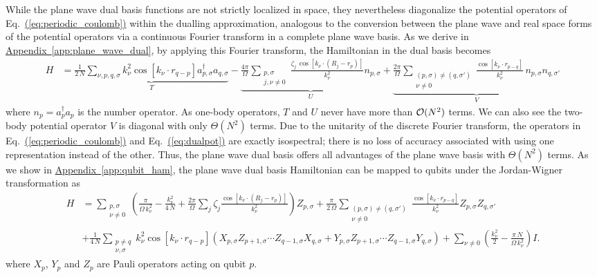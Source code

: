 \documentclass[superscriptaddress,aps,pra,nofootinbib,notitlepage,10pt,longbibliography]{revtex4-1}
\newcommand{\eq}[1]{Eq.~\hyperref[eq:#1]{(\ref*{eq:#1})}}
\DeclareRobustCommand{\app}[1]{\hyperref[app:#1]{Appendix~\ref*{app:#1}}}
\begin{document}
While the plane wave dual basis functions are not strictly localized in space, they nevertheless diagonalize the potential operators of \eq{periodic_coulomb} within the dualling approximation, analogous to the conversion between the plane wave
and real space forms of the potential operators
via a continuous Fourier transform in a complete plane wave basis. As we derive in \app{plane_wave_dual}, by applying this Fourier transform, the Hamiltonian in the dual basis becomes
\begin{align}
\label{eq:dualpot}
H & = \underbrace{\frac{1}{2\, N} \!\!\!\sum_{\nu, p, q, \sigma} \!\! k_\nu^2 \cos \left[k_\nu \cdot r_{q - p} \right] a^\dagger_{p, \sigma} a_{q,\sigma}}_{T}
%
- \underbrace{\frac{4 \pi}{\Omega} \sum_{\substack{p,\sigma \\ j, \nu\neq 0}} \frac{\zeta_j \, \cos\left[ k_{\nu} \cdot \left(R_j - r_{p}\right)\right]}{k_\nu^2} n_{p, \sigma}}_{U} +
%
\underbrace{\frac{2 \pi}{\Omega } \!\!\!\!\! \sum_{\substack{(p, \sigma) \neq (q, \sigma') \\ \nu \neq 0}}\!\!\!\!\!\!\!\! \frac{\cos \left[k_\nu \cdot r_{p-q}\right]}{k_\nu^2} \, n_{p, \sigma} n_{q, \sigma'}}_{V}
\end{align}
where $n_{p} = a^\dagger_{p} a_{p}$ is the number operator. As one-body operators, $T$ and $U$ never have more than ${\cal O}(N^2)$ terms. We can also see the two-body potential operator $V$ is diagonal with only $\Theta(N^2)$ terms. Due to the unitarity of the discrete Fourier transform, the operators in \eq{periodic_coulomb} and \eq{dualpot} are exactly isospectral; there is no loss of accuracy associated with using one representation instead of the other. Thus, the plane wave dual basis offers all advantages of the plane wave basis with $\Theta(N^2)$ terms. As we show in \app{qubit_ham}, the plane wave dual basis Hamiltonian can be mapped to qubits under the Jordan-Wigner transformation as
\begin{align}
\label{eq:jw_ham}
H & =  \sum_{\substack{p, \sigma \\ \nu \neq 0}}\left(\frac{\pi}{\Omega \, k_\nu^2} - \frac{k_\nu^2}{4 \, N} + \frac{2\pi}{\Omega} \sum_{j}\zeta_j \frac{\cos\left[k_\nu \cdot \left(R_j-r_p\right)\right]}{k_\nu^2}\right) Z_{p,\sigma}
%
+ \frac{\pi}{2\,\Omega } \sum_{\substack{(p, \sigma) \neq (q, \sigma') \\ \nu \neq 0}} \frac{\cos \left[k_\nu \cdot r_{p-q}\right]}{k_\nu^2} Z_{p,\sigma} Z_{q,\sigma'}\\
%
& + \frac{1}{4\, N} \sum_{\substack{p \neq q \\ \nu, \sigma}} k_\nu^2 \cos \left[k_\nu \cdot r_{q - p} \right] \left(X_{p,\sigma} Z_{p + 1,\sigma} \cdots Z_{q - 1,\sigma} X_{q,\sigma} + Y_{p,\sigma} Z_{p + 1,\sigma} \cdots Z_{q - 1,\sigma} Y_{q,\sigma} \right)
%
+ \sum_{\nu \neq 0} \left(\frac{k_\nu^2}{2}- \frac{\pi \, N}{\Omega \, k_\nu^2} \right) I\nonumber.
\end{align}
where $X_p$, $Y_p$ and $Z_p$ are Pauli operators acting on qubit $p$.
\end{document}
